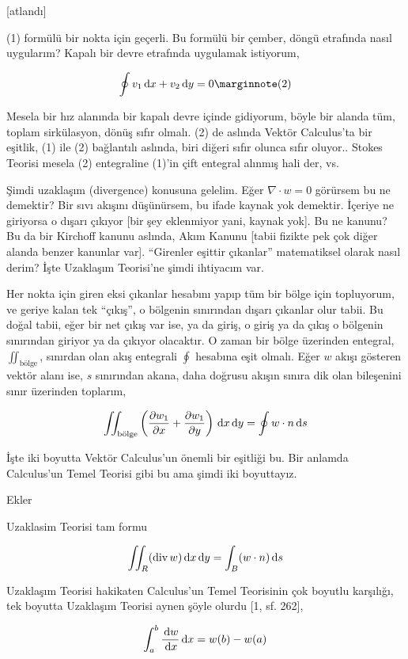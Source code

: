 \documentclass[12pt,fleqn]{article}\usepackage{../../common}
\begin{document}
[atlandı]

(1) formülü bir nokta için geçerli. Bu formülü bir çember, döngü etrafında
nasıl uygularım? Kapalı bir devre etrafında uygulamak istiyorum,

$$
\oint v_1 \ud x + v_2 \ud y = 0
\mlabel{2}
$$
 
Mesela bir hız alanında bir kapalı devre içinde gidiyorum, böyle bir alanda tüm,
toplam sirkülasyon, dönüş sıfır olmalı. (2) de aslında Vektör Calculus'ta bir
eşitlik, (1) ile (2) bağlantılı aslında, biri diğeri sıfır olunca sıfır oluyor..
Stokes Teorisi mesela (2) entegraline (1)'in çift entegral alınmış hali der, vs.

Şimdi uzaklaşım (divergence) konusuna gelelim. Eğer $\nabla \cdot w = 0$
görürsem bu ne demektir? Bir sıvı akışını düşünürsem, bu ifade kaynak yok
demektir. İçeriye ne giriyorsa o dışarı çıkıyor [bir şey eklenmiyor yani, kaynak
yok]. Bu ne kanunu? Bu da bir Kirchoff kanunu aslında, Akım Kanunu [tabii
fizikte pek çok diğer alanda benzer kanunlar var]. ``Girenler eşittir çıkanlar''
matematiksel olarak nasıl derim? İşte Uzaklaşım Teorisi'ne şimdi ihtiyacım var.

Her nokta için giren eksi çıkanlar hesabını yapıp tüm bir bölge için topluyorum,
ve geriye kalan tek ``çıkış'', o bölgenin sınırından dışarı çıkanlar olur tabii.
Bu doğal tabii, eğer bir net çıkış var ise, ya da giriş, o giriş ya da çıkış o
bölgenin sınırından giriyor ya da çıkıyor olacaktır. O zaman bir bölge üzerinden
entegral, $\iint_{\textrm{bölge}}$, sınırdan olan akış entegrali $\oint$
hesabına eşit olmalı. Eğer $w$ akışı gösteren vektör alanı ise, $s$ sınırından
akana, daha doğrusu akışın sınıra dik olan bileşenini sınır üzerinden toplarım,

$$
\iint_{\textrm{bölge}} \left( 
\frac{\partial w_1}{\partial x} +
\frac{\partial w_1}{\partial y}   \right)
\,\mathrm{d} x \,\mathrm{d} y =
\oint w \cdot n \,\mathrm{d} s
$$

İşte iki boyutta Vektör Calculus'un önemli bir eşitliği bu. Bir anlamda
Calculus'un Temel Teorisi gibi bu ama şimdi iki boyuttayız.

Ekler

Uzaklasim Teorisi tam formu

$$
\iint_R (\operatorname{div} w) \,\mathrm{d} x \,\mathrm{d} y = \int_B  ( w \cdot n ) \,\mathrm{d} s
$$

Uzaklaşım Teorisi hakikaten Calculus'un Temel Teorisinin çok boyutlu karşılığı,
tek boyutta Uzaklaşım Teorisi aynen şöyle olurdu [1, sf. 262],

$$
\int _{a}^{b} \frac{\,\mathrm{d} w}{\,\mathrm{d} x} \,\mathrm{d} x = w(b) - w(a)
$$
\end{document}
